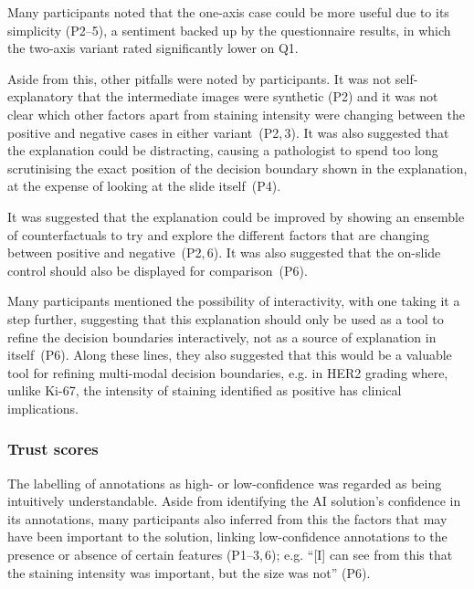 \documentclass[final,5p,times,twocolumn,hyphens]{elsarticle}
\begin{document}
Many participants noted that the one-axis case could be more useful due to its simplicity (P2--5), a sentiment backed up by the questionnaire results, in which the two-axis variant rated significantly lower on Q1.

Aside from this, other pitfalls were noted by participants. It was not self-explanatory that the intermediate images were synthetic (P2) and it was not clear which other factors apart from staining intensity were changing between the positive and negative cases in either variant~(P2,\,3). It was also suggested that the explanation could be distracting, causing a pathologist to spend too long scrutinising the exact position of the decision boundary shown in the explanation, at the expense of looking at the slide itself~(P4).

It was suggested that the explanation could be improved by showing an ensemble of counterfactuals to try and explore the different factors that are changing between positive and negative~(P2,\,6). It was also suggested that the on-slide control should also be displayed for comparison~(P6).

Many participants mentioned the possibility of interactivity, with one taking it a step further, suggesting that this explanation should only be used as a tool to  refine the decision boundaries interactively, not as a source of explanation in itself~(P6). Along these lines, they also suggested that this would be a valuable tool for refining multi-modal decision boundaries, e.g. in HER2 grading where, unlike Ki-67, the intensity of staining identified as positive has clinical implications.

\subsubsection{Trust scores}

The labelling of annotations as high- or low-confidence was regarded as being intuitively understandable. Aside from identifying the AI solution's confidence in its annotations, many participants also inferred from this the factors that may have been important to the solution, linking low-confidence annotations to the presence or absence of certain features (P1--3,\,6); e.g. ``[I] can see from this that the staining intensity was important, but the size was not'' (P6).

\end{document}
